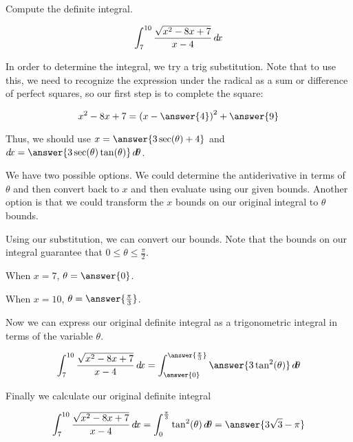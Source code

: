 \documentclass{ximera}
\author{Jason Miller}
\begin{document}
\begin{exercise}
Compute the definite integral. 

\[
\int_{7}^{10} \frac{\sqrt{x^{2}-8x+7}}{x-4} \mathop{}\!d\! x
\]



In order to determine the integral, we try a trig substitution.  Note that to use this, we need to recognize the expression under the radical as a sum or difference of perfect squares, so our first step is to complete the square:

\[
x^2-8x+7 = \left(x - \answer{4}\right)^2+\answer{9}
\]

\begin{exercise}
Thus, we should use $x=\answer{3\sec(\theta)+4}$ and $\d x= \answer{ 3\sec(\theta)\tan(\theta)} \d \theta$. 


\begin{exercise}
We have two possible options. We could determine the antiderivative in terms of $\theta$ 
and then convert back to $x$ and then evaluate using our given bounds. 
Another option is that we could transform the $x$ bounds on our original integral to $\theta$ bounds. 

Using our substitution, we can convert our bounds. Note that the bounds on our integral guarantee that $0\leq \theta \leq \frac{\pi}{2}$. 

When $x=7$, $\theta=\answer{0}$. 

When $x=10$, $\theta=\answer{\frac{\pi}{3}}$. 



\begin{exercise}


Now we can express our original definite integral as a trigonometric integral in terms of the variable $\theta$. 

\[
\int_{7}^{10} \frac{\sqrt{x^{2}-8x+7}}{x-4}  \d x= \int_{\answer{0}}^{\answer{\frac{\pi}{3}}}  \answer{3\tan^{2}(\theta)}   \d \theta
\]

\begin{exercise}
Finally we calculate our original definite integral 

\[
\int_{7}^{10} \frac{\sqrt{x^{2}-8x+7}}{x-4} \d x=\int_{0}^{\frac{\pi}{3}} \tan^{2}(\theta) \d \theta=\answer{3\sqrt{3}-\pi}
\]



\end{exercise}
\end{exercise}
\end{exercise}
\end{exercise}

\end{exercise}
\end{document}
